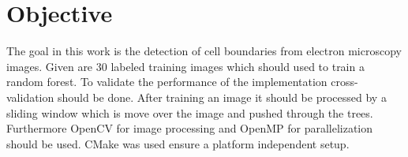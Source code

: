 \section{Objective}
\label{sec:objective}

The goal in this work is the detection of cell boundaries from electron microscopy images. Given are 30 labeled training images which should used to train a random forest.
To validate the performance of the implementation cross-validation should be done.
After training an image it should be processed by a sliding window which is move over the image and pushed through the trees.
Furthermore OpenCV for image processing and OpenMP for parallelization should be used. CMake was used ensure a platform independent setup.